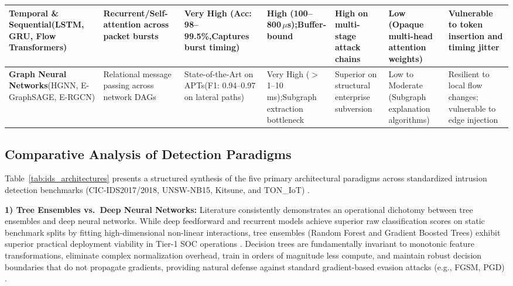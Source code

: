 \documentclass[conference,10pt,twocolumn,a4paper]{IEEEtran}
\begin{document}
\begin{table}[t]
{\begin{tabular}{p{2.6cm}p{2.4cm}p{2.2cm}p{1.8cm}p{2.3cm}p{2.3cm}p{2.8cm}}
\midrule
\textbf{Temporal \& Sequential}\newline (LSTM, GRU, Flow Transformers) & Recurrent/Self-attention across packet bursts & Very High (Acc: 98--99.5\%,\newline Captures burst timing) & High (100--800\,$\mu$s);\newline Buffer-bound & High on multi-stage attack chains & Low (Opaque multi-head attention weights) & Vulnerable to token insertion and timing jitter \cite{zou2023universal} \\
\midrule
\textbf{Graph Neural Networks}\newline (HGNN, E-GraphSAGE, E-RGCN) & Relational message passing across network DAGs & State-of-the-Art on APTs\newline (F1: 0.94--0.97 on lateral paths) & Very High ($>$1--10\,ms);\newline Subgraph extraction bottleneck & Superior on structural enterprise subversion & Low to Moderate (Subgraph explanation algorithms) & Resilient to local flow changes; vulnerable to edge injection \cite{jiang2024provenance} \\
\bottomrule
\end{tabular}%
}
\end{table}

\subsection{Comparative Analysis of Detection Paradigms}
Table~\ref{tab:ids_architectures} presents a structured synthesis of the five primary architectural paradigms across standardized intrusion detection benchmarks (CIC-IDS2017/2018, UNSW-NB15, Kitsune, and TON\_IoT) \cite{ozkan2024cybersecurity, kaur2023deep, mirsky2018kitsune, gokstorp2026survey}.

\textbf{1) Tree Ensembles vs.\ Deep Neural Networks:} Literature consistently demonstrates an operational dichotomy between tree ensembles and deep neural networks. While deep feedforward and recurrent models achieve superior raw classification scores on static benchmark splits by fitting high-dimensional non-linear interactions, tree ensembles (Random Forest and Gradient Boosted Trees) exhibit superior practical deployment viability in Tier-1 SOC operations \cite{ozkan2024cybersecurity}. Decision trees are fundamentally invariant to monotonic feature transformations, eliminate complex normalization overhead, train in orders of magnitude less compute, and maintain robust decision boundaries that do not propagate gradients, providing natural defense against standard gradient-based evasion attacks (e.g., FGSM, PGD) \cite{goodfellow2015explaining, carlini2017towards}.
\end{document}
